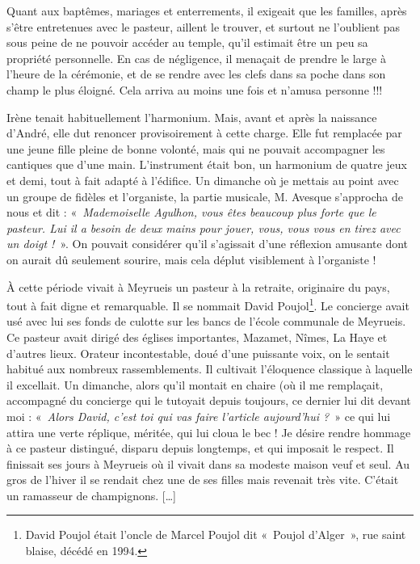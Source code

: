 Quant aux baptêmes, mariages et enterrements, il exigeait que les familles, après
s’être entretenues avec le pasteur, aillent le trouver, et surtout ne l’oublient pas sous
peine de ne pouvoir accéder au temple, qu’il estimait être un peu sa propriété
personnelle. En cas de négligence, il menaçait de prendre le large à l’heure de la
cérémonie, et de se rendre avec les clefs dans sa poche dans son champ le plus
éloigné. Cela arriva au moins une fois et n’amusa personne !!!

Irène tenait habituellement l’harmonium. Mais, avant et après la naissance d’André,
elle dut renoncer provisoirement à cette charge. Elle fut remplacée par une jeune fille
pleine de bonne volonté, mais qui ne pouvait accompagner les cantiques que d’une
main. L’instrument était bon, un harmonium de quatre jeux et demi, tout à fait adapté
à l’édifice. Un dimanche où je mettais au point avec un groupe de fidèles et
l’organiste, la partie musicale, M. Avesque s’approcha de nous et dit :
«~\emph{Mademoiselle Agulhon, vous êtes beaucoup plus forte que le pasteur. Lui il a
besoin de deux mains pour jouer, vous, vous vous en tirez avec un doigt !}~». On
pouvait considérer qu’il s’agissait d’une réflexion amusante dont on aurait dû
seulement sourire, mais cela déplut visiblement à l’organiste !

À cette période vivait à Meyrueis un pasteur à la retraite, originaire du pays, tout à
fait digne et remarquable. Il se nommait David Poujol\footnote{David Poujol était l’oncle de Marcel Poujol dit «~Poujol d’Alger~», rue saint blaise, décédé en 1994.}. Le concierge avait usé avec
lui ses fonds de culotte sur les bancs de l'école communale de Meyrueis. Ce pasteur
avait dirigé des églises importantes, Mazamet, Nîmes, La Haye et d’autres lieux.
Orateur incontestable, doué d’une puissante voix, on le sentait habitué aux nombreux
rassemblements. Il cultivait l’éloquence classique à laquelle il excellait. Un
dimanche, alors qu’il montait en chaire (où il me remplaçait, accompagné du
concierge qui le tutoyait depuis toujours, ce dernier lui dit devant moi : «~\emph{Alors
David, c’est toi qui vas faire l’article aujourd’hui ?}~» ce qui lui attira une verte
réplique, méritée, qui lui cloua le bec !
Je désire rendre hommage à ce pasteur distingué, disparu depuis longtemps, et qui
imposait le respect. Il finissait ses jours à Meyrueis où il vivait dans sa modeste
maison veuf et seul. Au gros de l’hiver il se rendait chez une de ses filles mais
revenait très vite. C’était un ramasseur de champignons. [\ldots]

